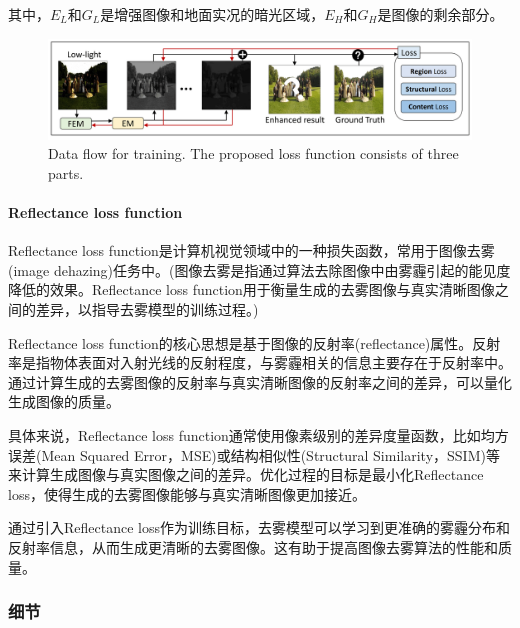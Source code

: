 \documentclass[letterpaper,12pt]{article}
\begin{document}
	其中，$E_L$和$G_L$是增强图像和地面实况的暗光区域，$E_H$和$G_H$是图像的剩余部分。	
	\begin{figure}[htbp] 
		\centering 
		\includegraphics[width=0.8\columnwidth]{proposed_loss_function}
		\captionsetup{font=scriptsize}
		\caption{
			\label{fig: proposed_loss_function} %
			Data flow for training. The proposed loss function consists of three parts.
		}
	\end{figure}
	
	\paragraph{Reflectance loss function}
	
	Reflectance loss function是计算机视觉领域中的一种损失函数，常用于图像去雾(image dehazing)任务中。(图像去雾是指通过算法去除图像中由雾霾引起的能见度降低的效果。Reflectance loss function用于衡量生成的去雾图像与真实清晰图像之间的差异，以指导去雾模型的训练过程。)
	
	Reflectance loss function的核心思想是基于图像的反射率(reflectance)属性。反射率是指物体表面对入射光线的反射程度，与雾霾相关的信息主要存在于反射率中。通过计算生成的去雾图像的反射率与真实清晰图像的反射率之间的差异，可以量化生成图像的质量。
	
	具体来说，Reflectance loss function通常使用像素级别的差异度量函数，比如均方误差(Mean Squared Error，MSE)或结构相似性(Structural Similarity，SSIM)等来计算生成图像与真实图像之间的差异。优化过程的目标是最小化Reflectance loss，使得生成的去雾图像能够与真实清晰图像更加接近。
	
	通过引入Reflectance loss作为训练目标，去雾模型可以学习到更准确的雾霾分布和反射率信息，从而生成更清晰的去雾图像。这有助于提高图像去雾算法的性能和质量。
	
	\subsubsection{细节}
	
	\renewcommand{\tablename}{Table}
	
\end{document}

